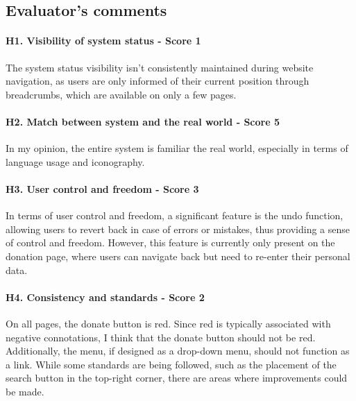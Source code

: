 \clearpage

\subsection*{Evaluator's comments}
\paragraph{H1. Visibility of system status - Score 1}	The system status visibility isn't consistently maintained during website navigation, as users are only informed of their current position through breadcrumbs, which are available on only a few pages.
\newline
\paragraph{H2. Match between system and the real world - Score 5}	In my opinion, the entire system is familiar the real world, especially in terms of language usage and iconography.
\newline
\paragraph{H3. User control and freedom - Score 3}	In terms of user control and freedom, a significant feature is the undo function, allowing users to revert back in case of errors or mistakes, thus providing a sense of control and freedom. However, this feature is currently only present on the donation page, where users can navigate back but need to re-enter their personal data.
\newline
\paragraph{H4. Consistency and standards - Score 2}	On all pages, the donate button is red. Since red is typically associated with negative connotations, I think that the donate button should not be red. Additionally, the menu, if designed as a drop-down menu, should not function as a link. While some standards are being followed, such as the placement of the search button in the top-right corner, there are areas where improvements could be made.
\newline
